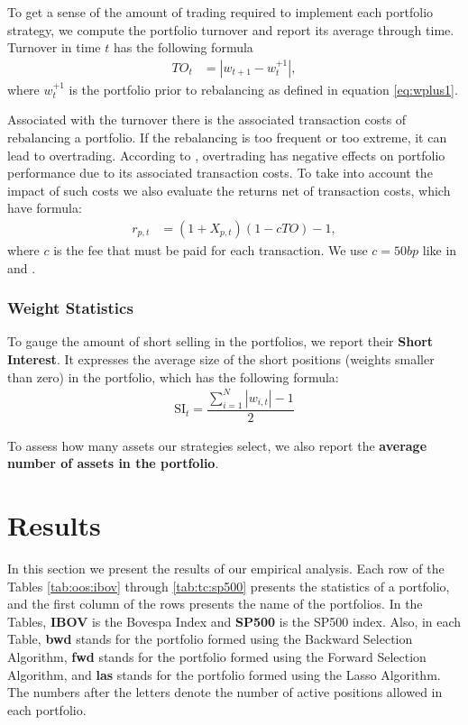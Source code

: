 \documentclass[preprint, doubleblind, authoryear,10pt]{elsarticle}
\begin{document}
To get a sense of the amount of trading required to implement each portfolio strategy, we compute the portfolio turnover and report its average through time.
Turnover in time $t$ has the following formula
\begin{align}
	\label{to}
	TO_{t} &= |w_{t+1} - w_{t}^{+1}|,
\end{align}
where $w_{t}^{+1}$ is the portfolio prior to rebalancing as defined in equation \eqref{eq:wplus1}.

Associated with the turnover there is the associated transaction costs of rebalancing a portfolio.
If the rebalancing is too frequent or too extreme, it can lead to overtrading.
According to \cite{barber-2000}, overtrading has negative effects on portfolio performance due to its associated transaction costs.
To take into account the impact of such costs we also evaluate the returns net of transaction costs, which have formula:
\begin{align}
	r_{p,t} &= (1 + X_{p,t} )(1 - c TO) - 1,
\end{align}
where $c$ is the fee that must be paid for each transaction.
We use $c=50bp$ like in \cite{dgu2009} and \cite{fko-2012}.

\subsubsection*{Weight Statistics}

To gauge the amount of short selling in the portfolios, we report their \textbf{Short Interest}.
It expresses the average size of the short positions (weights smaller than zero) in the portfolio, which has the following formula:
\begin{align}
	\text{SI}_{t} = \dfrac{\sum_{i=1}^{N} |w_{i,t}| - 1}{2}
\end{align}

To assess how many assets our strategies select, we also report the \textbf{average number of assets in the portfolio}.

\section{Results} \label{sec:results}

In this section we present the results of our empirical analysis.
Each row of the Tables \ref{tab:oos:ibov} through \ref{tab:tc:sp500} presents the statistics of a portfolio, and the first column of the rows presents the name of the portfolios.
In the Tables, \textbf{IBOV} is the Bovespa Index and \textbf{SP500} is the SP500 index. 
Also, in each Table,
\textbf{bwd} stands for the portfolio formed using the Backward Selection Algorithm, 
\textbf{fwd} stands for the portfolio formed using the Forward Selection Algorithm, and
\textbf{las} stands for the portfolio formed using the Lasso Algorithm.
The numbers after the letters denote the number of active positions allowed in each portfolio.
\end{document}
